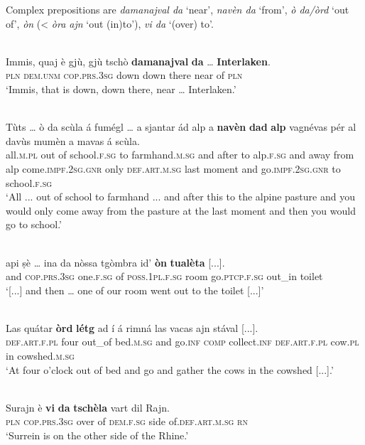 Complex prepositions are \textit{damanajval da} `near', \textit{navèn da} `from', \textit{ò da/òrd} `out of', \textit{òn} (< \textit{òra ajn} `out (in)to'), \textit{vi da} `(over) to'.

\ea
\label{}
\\
\gll  Immis, quaj è gjù, gjù tschò \textbf{damanajval} \textbf{da} … \textbf{Interlaken}.\\
\textsc{pln} \textsc{dem.unm} \textsc{cop.prs.3sg} down down there near of {} \textsc{pln} \\
\glt `Immis, that is down, down there, near … Interlaken.'
\z

\ea
\label{}
\\
\gll  Tùts … ò da scùla á fumégl … a sjantar ád alp a \textbf{navèn} \textbf{dad} \textbf{alp} vagnévas pér al davùs mumèn a mavas á scùla. \\
all.\textsc{m.pl} {} out of school.\textsc{f.sg} to farmhand.\textsc{m.sg} {} and after to alp.\textsc{f.sg} and away from alp come.\textsc{impf.2sg.gnr} only \textsc{def.art.m.sg} last moment and go.\textsc{impf.2sg.gnr} to school.\textsc{f.sg}\\
\glt `All ... out of school to farmhand ... and after this to the alpine pasture and you would only come away from the pasture at the last moment and then you would go to school.'
\z

\ea
\label{}
\\
\gll    [...] api ṣè …  ina da nòssa tgòmbra id’ \textbf{òn} \textbf{tualèta} [...].\\
{} and \textsc{cop.prs.3sg} {} one.\textsc{f.sg} of \textsc{poss.1pl.f.sg} room go.\textsc{ptcp.f.sg} out\_in toilet\\
\glt `[...] and then … one of our room went out to the toilet [...]'
\z

\ea
\label{}
\\
\gll Las quátar \textbf{òrd} \textbf{létg} ad í á rimná las vacas ajn stával [...].\\
\textsc{def.art.f.pl} four out\_of bed.\textsc{m.sg} and go.\textsc{inf} \textsc{comp} collect.\textsc{inf} \textsc{def.art.f.pl} cow.\textsc{pl} in cowshed.\textsc{m.sg}\\
\glt `At four o'clock out of bed and go and gather the cows in the cowshed [...].'
\z

\ea
\label{}
\\
\gll Surajn è \textbf{vi} \textbf{da} \textbf{tschèla} vart dil Rajn.\\
\textsc{pln} \textsc{cop.prs.3sg} over of \textsc{dem.f.sg} side of.\textsc{def.art.m.sg} \textsc{rn} \\
\glt `Surrein is on the other side of the Rhine.'
\z

